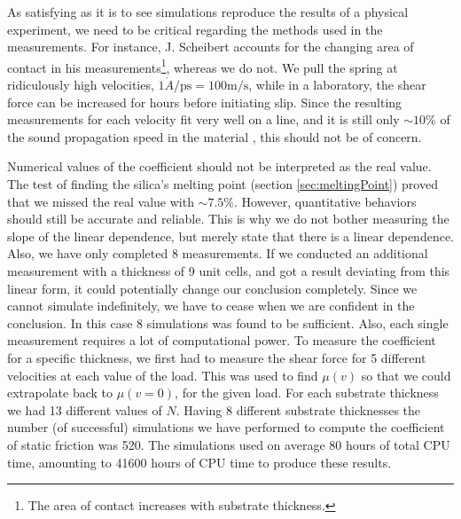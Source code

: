 \documentclass[twoside,english]{uiofysmaster}
\begin{document}
As satisfying as it is to see simulations reproduce the results of a physical experiment, we need to be critical regarding the methods used in the measurements.
For instance, J. Scheibert accounts for the changing area of contact in his measurements\footnote{The area of contact increases with substrate thickness.}, whereas we do not.
We pull the spring at ridiculously high velocities, $1\mathring{A}/\text{ps} = 100\text{m/s}$, while in a laboratory, the shear force can be increased for hours before initiating slip. 
Since the resulting measurements for each velocity fit very well on a line, and it is still only $\sim10\%$ of the sound propagation speed in the material \cite{melosh2007}, this should not be of concern. 
 

Numerical values of the coefficient should not be interpreted as the real value. 
The test of finding the silica's melting point (section \ref{sec:meltingPoint}) proved that we missed the real value with $\sim7.5\%$.
However, quantitative behaviors should still be accurate and reliable.
This is why we do not bother measuring the slope of the linear dependence, but merely state that there is a linear dependence.   
Also, we have only completed 8 measurements. 
If we conducted an additional measurement with a thickness of 9 unit cells, and got a result deviating from this linear form, it could potentially change our conclusion completely. 
Since we cannot simulate indefinitely, we have to cease when we are confident in the conclusion.  
In this case 8 simulations was found to be sufficient. 
Also, each single measurement requires a lot of computational power. 
To measure the coefficient for a specific thickness, we first had to measure the shear force for 5 different velocities at each value of the load. 
This was used to find $\mu(v)$ so that we could extrapolate back to $\mu(v=0)$, for the given load. 
For each substrate thickness we had 13 different values of $N$.
Having 8 different substrate thicknesses the number (of successful) simulations we have performed to compute the coefficient of static friction was 520. 
The simulations used on average 80 hours of total CPU time, amounting to 41600 hours of CPU time to produce these results.
\end{document}
